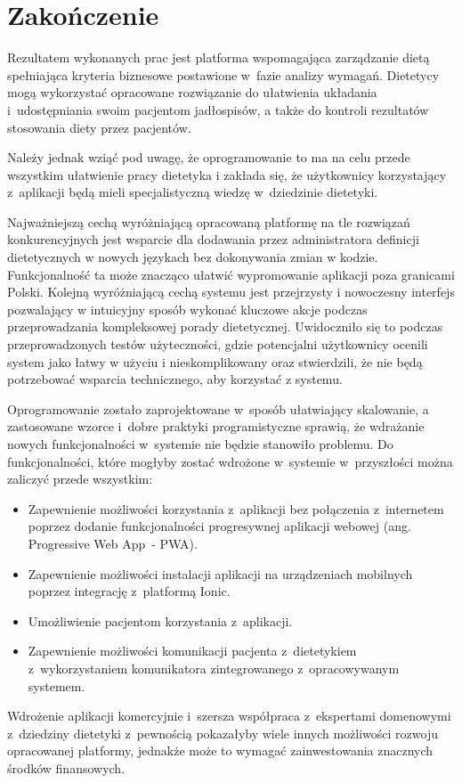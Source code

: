 \chapter*{Zakończenie}\label{ch:ending}
Rezultatem wykonanych prac jest platforma wspomagająca zarządzanie dietą spełniająca kryteria biznesowe postawione w~fazie analizy wymagań.
Dietetycy mogą wykorzystać opracowane rozwiązanie do ułatwienia układania i~udostępniania swoim pacjentom jadłospisów,
a także do kontroli rezultatów stosowania diety przez pacjentów.

\par
Należy jednak wziąć pod uwagę, że oprogramowanie to ma na celu przede wszystkim ułatwienie pracy dietetyka
i zakłada się, że użytkownicy korzystający z~aplikacji będą mieli specjalistyczną wiedzę w~dziedzinie dietetyki.

\par
Najważniejszą cechą wyróżniającą opracowaną platformę na tle rozwiązań konkurencyjnych
jest wsparcie dla dodawania przez administratora definicji dietetycznych w nowych językach bez dokonywania zmian w kodzie.
Funkcjonalność ta może znacząco ułatwić wypromowanie aplikacji poza granicami Polski.
Kolejną wyróżniającą cechą systemu jest przejrzysty i nowoczesny interfejs pozwalający w intuicyjny sposób wykonać kluczowe akcje podczas przeprowadzania kompleksowej porady dietetycznej.
Uwidoczniło się to podczas przeprowadzonych testów użyteczności, gdzie potencjalni użytkownicy ocenili system jako łatwy w użyciu i nieskomplikowany
oraz stwierdzili, że nie będą potrzebować wsparcia technicznego, aby korzystać z systemu.

\par
Oprogramowanie zostało zaprojektowane w~sposób ułatwiający skalowanie,
a zastosowane wzorce i~dobre praktyki programistyczne sprawią, że wdrażanie nowych funkcjonalności w~systemie nie będzie stanowiło problemu.
Do funkcjonalności, które mogłyby zostać wdrożone w~systemie w~przyszłości można zaliczyć przede wszystkim:
\begin{itemize}
    \item Zapewnienie możliwości korzystania z~aplikacji bez połączenia z~internetem poprzez dodanie funkcjonalności progresywnej aplikacji webowej (ang. Progressive Web App~- PWA)\cite{url:pwa}.
    \item Zapewnienie możliwości instalacji aplikacji na urządzeniach mobilnych poprzez integrację z~platformą Ionic\cite{tech:ionic}.
    \item Umożliwienie pacjentom korzystania z~aplikacji.
    \item Zapewnienie możliwości komunikacji pacjenta z~dietetykiem z~wykorzystaniem komunikatora zintegrowanego z~opracowywanym systemem.
\end{itemize}

\par
Wdrożenie aplikacji komercyjnie i~szersza współpraca z~ekspertami domenowymi z~dziedziny dietetyki z~pewnością pokazałyby wiele innych możliwości rozwoju opracowanej platformy,
jednakże może to wymagać zainwestowania znacznych środków finansowych.
\thispagestyle{normal}
